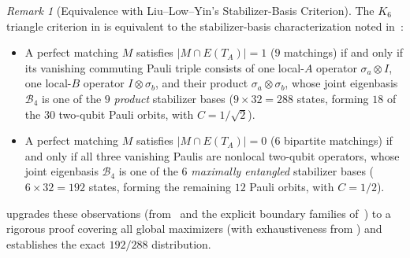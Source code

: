 \documentclass[11pt,a4paper]{article}
\theoremstyle{plain}
\theoremstyle{definition}
\theoremstyle{remark}
\newtheorem{remark}[theorem]{Remark}
\begin{document}
\begin{remark}[Equivalence with Liu--Low--Yin's Stabilizer-Basis Criterion]
\label{rem:lly-conc-equiv}
The $K_6$ triangle criterion in  is equivalent to the stabilizer-basis characterization noted in~\cite{LiuLowYin2026}:
\begin{itemize}[leftmargin=1.8em, itemsep=1pt]
  \item A perfect matching $M$ satisfies $\lvert M \cap E(T_A)\rvert = 1$ ($9$ matchings) if and only if its vanishing commuting Pauli triple consists of one local-$A$ operator $\sigma_a \otimes I$, one local-$B$ operator $I \otimes \sigma_b$, and their product $\sigma_a \otimes \sigma_b$, whose joint eigenbasis $\mathcal{B}_4$ is one of the $9$ \emph{product} stabilizer bases ($9 \times 32 = 288$ states, forming $18$ of the $30$ two-qubit Pauli orbits, with $C = 1/\sqrt{2}$).
  \item A perfect matching $M$ satisfies $\lvert M \cap E(T_A)\rvert = 0$ ($6$ bipartite matchings) if and only if all three vanishing Paulis are nonlocal two-qubit operators, whose joint eigenbasis $\mathcal{B}_4$ is one of the $6$ \emph{maximally entangled} stabilizer bases ($6 \times 32 = 192$ states, forming the remaining $12$ Pauli orbits, with $C = 1/2$).
\end{itemize}
 upgrades these observations (from~\cite{LiuLowYin2026} and the explicit boundary families of~\cite{Roman2026}) to a rigorous proof covering all global maximizers (with exhaustiveness from ) and establishes the exact $192/288$ distribution.
\end{remark}
\end{document}
